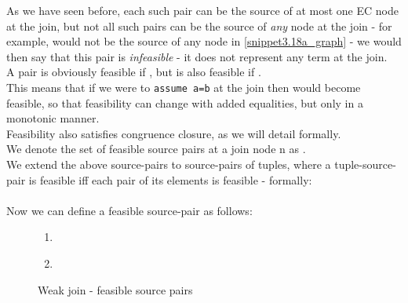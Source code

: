 As we have seen before, each such pair can be the source of at most one EC node at the join, 
but not all such pairs can be the source of \emph{any} node at the join - for example,  
would not be the source of any node in \ref{snippet3.18a_graph} - we would then say that this pair is \emph{infeasible} - it does not represent any term at the join. \\
A pair  is obviously feasible if ,
but is also feasible if .\\
This means that if we were to \lstinline{assume a=b} at the join then  would become feasible, 
so that feasibility can change with added equalities, but only in a monotonic manner.\\
Feasibility also satisfies congruence closure, as we will detail formally.\\
We denote the set of feasible source pairs at a join node n as .\\
We extend the above source-pairs to source-pairs of tuples, where a tuple-source-pair is feasible iff each pair of its elements is feasible - formally:\\
\\
Now we can define a feasible source-pair as follows:
\begin{figure}[H]
\begin{enumerate}
	\item {}\\
	\item {}\\
\end{enumerate}
\caption{Weak join - feasible source pairs}
\end{figure}

